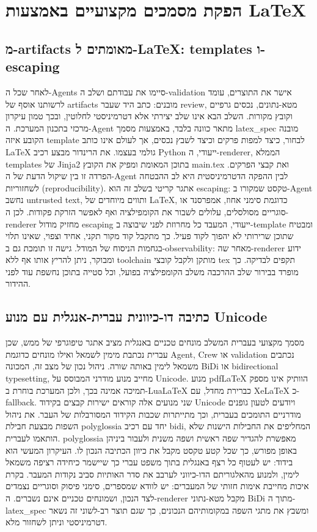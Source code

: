 \chapter{הפקת מסמכים מקצועיים באמצעות LaTeX}
\section{מ-artifacts מאומתים ל-LaTeX: templates ו-escaping}
לאחר שכל ה-Agents סיימו את עבודתם ושלב ה-validation אישר את התוצרים, עומד לרשותנו אוסף של artifacts מובנים: כתב היד שעבר review, מטא-נתונים, נכסים גרפיים וקובץ מקורות. השלב הבא אינו שלב יצירתי אלא דטרמיניסטי לחלוטין, ובכך טמון עיקרון מרכזי בתכנון המערכת. ה-Agent מתאר כוונה בלבד, באמצעות מסמך latex\_spec מובנה הקובע איזה template לבחור, כיצד למפות פרקים וכיצד לשבץ נכסים, אך לעולם אינו כותב LaTeX גולמי בעצמו. את הרינדור מבצע רכיב Python ייעודי, ה-renderer, הממלא templates של Jinja2 בתוכן המאומת ומפיק את הקובץ main.tex ואת קבצי הפרקים. הפרדה זו בין שיקול הדעת של ה-Agent לבין ההפקה הדטרמיניסטית היא לב ההבטחה לשחזוריות (reproducibility). אתגר קריטי בשלב זה הוא escaping: טקסט שמקורו ב-Agent נחשב untrusted text, ותווים מיוחדים של LaTeX, כדוגמת סימני אחוז, אמפרסנד או סוגריים מסולסלים, עלולים לשבור את הקומפילציה ואף לאפשר הזרקת פקודות. לכן ה-renderer מחזיק מודול escaping ייעודי, המעבד כל מחרוזת לפני שיבוצה ב-template ומבטיח שתוכן שרירותי לא יהפוך לקוד פעיל. כך מתקבל קוד מקור תקני, אחיד וצפוי, שאינו תלוי בגחמות הניסוח של המודל. גישה זו תומכת גם ב-observability: מאחר שה-renderer ידוע ומבוקר, ניתן להריץ אותו אף ללא toolchain מותקן ולקבל קובצי tex תקפים לבדיקה. כך מופרד בבירור שלב ההרכבה משלב הקומפילציה בפועל, וכל סטייה בתוכן נחשפת עוד לפני ההידור.

\section{כתיבה דו-כיוונית עברית-אנגלית עם מנוע Unicode}
מסמך מקצועי בעברית המשלב מונחים טכניים באנגלית מציב אתגר טיפוגרפי של ממש, שכן עברית נכתבת מימין לשמאל ואילו מונחים כדוגמת Agent, Crew או validation נכתבים משמאל לימין באותה שורה. ניהול נכון של מצב זה, המכונה BiDi או bidirectional typesetting, מחייב מנוע מודרני המבוסס על Unicode. מנוע pdfLaTeX הוותיק אינו מספק תמיכה אמינה בכך, ולכן המערכת בוחרת ב-LuaLaTeX כברירת מחדל, עם XeLaTeX כ-fallback. שני מנועים אלה קוראים ישירות קבצים בקידוד Unicode ויודעים לטעון גופנים מודרניים התומכים בעברית, וכך מתייתרות שכבות הקידוד המסורבלות של העבר. את ניהול השפות מבצעת חבילת polyglossia יחד עם רכיב bidi, המחליפים את החבילות הישנות שלא הותאמו לעברית. polyglossia מאפשרת להגדיר שפה ראשית ושפה משנית ולעבור ביניהן באופן מפורש, כך שכל קטע טקסט מקבל את כיוון הכתיבה הנכון לו. העיקרון המעשי הוא בידוד: יש לעטוף כל רצף באנגלית בתוך משפט עברי כך שיישמר כיחידה רציפה משמאל לימין, ולמנוע מהאלגוריתם הדו-כיווני לערבב את סדר האותיות סביב נקודות המעבר. בקרת איכות מחייבת אימות חזותי של המעברים: יש לוודא שמספרים, סימני פיסוק וסוגריים נצמדים לצד הנכון, ושמונחים טכניים אינם נשברים. ה-renderer מקבל מטא-נתוני BiDi מתוך ה-latex\_spec ומשבץ את מתגי השפה במקומותיהם הנכונים, כך שגם תוצר רב-לשוני זה נשאר דטרמיניסטי וניתן לשחזור מלא.

